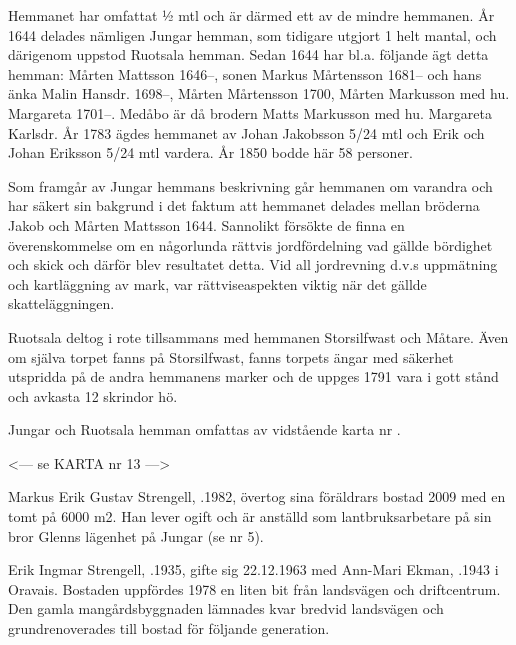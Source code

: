 Hemmanet har omfattat ½ mtl och är därmed ett av de mindre hemmanen. År 1644 delades nämligen Jungar hemman, som tidigare utgjort 1 helt mantal, och därigenom uppstod Ruotsala hemman. Sedan 1644 har bl.a. följande ägt detta hemman:
Mårten Mattsson 1646--, sonen Markus Mårtensson 1681-- och hans änka Malin Hansdr. 1698--, Mårten Mårtensson  1700, Mårten Markusson med hu. Margareta 1701--. Medåbo är då brodern Matts Markusson med hu. Margareta Karlsdr. År 1783 ägdes hemmanet av Johan Jakobsson 5/24 mtl och Erik och Johan Eriksson 5/24 mtl vardera. År 1850 bodde här 58 personer.

Som framgår av Jungar hemmans beskrivning går hemmanen om varandra och har säkert sin bakgrund i det faktum att hemmanet delades mellan bröderna Jakob och Mårten Mattsson 1644. Sannolikt försökte de finna en överenskommelse om en någorlunda rättvis jordfördelning vad gällde bördighet och skick och därför blev resultatet detta. Vid all jordrevning d.v.s uppmätning och kartläggning av mark, var rättviseaspekten viktig när det gällde skatteläggningen.

Ruotsala deltog i rote tillsammans med hemmanen Storsilfwast och Måtare. Även om själva torpet fanns på Storsilfwast, fanns torpets ängar med säkerhet utspridda på de andra hemmanens marker och de uppges 1791 vara i gott stånd och avkasta 12 skrindor hö.


Jungar och Ruotsala hemman omfattas av vidstående karta nr .


<--- se KARTA nr 13 --->






Markus Erik Gustav Strengell, .1982, övertog sina föräldrars bostad 2009 med en tomt på 6000 m2. Han lever ogift och är anställd som lantbruksarbetare på sin bror Glenns lägenhet på Jungar (se nr 5).\jhvspace{}



Erik Ingmar Strengell, .1935, gifte sig 22.12.1963 med Ann-Mari Ekman, .1943 i Oravais. Bostaden uppfördes 1978 en liten bit från landsvägen och driftcentrum. Den gamla mangårdsbyggnaden lämnades kvar bredvid landsvägen och grundrenoverades till bostad för följande generation.\jhvspace{}



